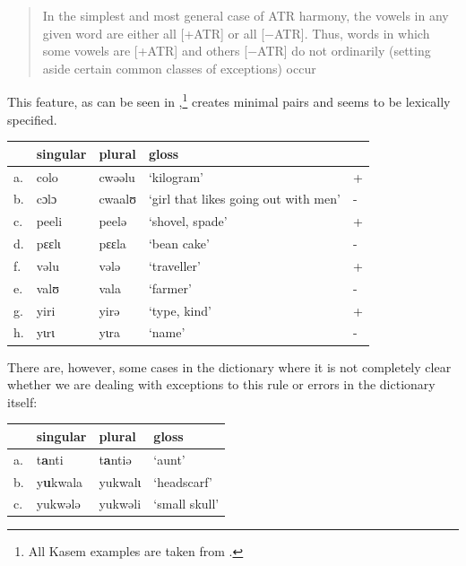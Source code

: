 \begin{quotation}
In the simplest and most general case of ATR harmony, the vowels in any given word are either all [+ATR] or all [−ATR]. Thus, words in which some vowels are [+ATR] and others [−ATR] do not ordinarily (setting aside certain common classes of exceptions) occur \autocite[496]{Casali.2008}
\end{quotation}

This feature, as can be seen in ,\footnote{All Kasem examples are taken from \textcite{Niggli.2016}.} creates minimal pairs and seems to be lexically specified.

\begin{exe}
    \ex \label{atr}
    \begin{tabular}[t]{lllll}
      & singular & plural & gloss                                &   \\
      \midrule
      a. & colo     & cwəəlu & `kilogram'                           & + \\
      b. & cɔlɔ     & cwaalʊ & `girl that likes going out with men' & - \\
      c. & peeli    & peelə  & `shovel, spade'                      & + \\
      d. & pɛɛlɩ    & pɛɛla  & `bean cake'                          & - \\
      f. & vəlu     & vələ   & `traveller'                          & + \\
      e. & valʊ     & vala   & `farmer'                             & - \\
      g. & yiri     & yirə   & `type, kind'                         & + \\
      h. & yɩrɩ     & yɩra   & `name'                               & - \\
    \end{tabular}
\end{exe}

There are, however, some cases in the dictionary where it is not completely clear whether we are dealing with exceptions to this rule or errors in the dictionary itself:

\begin{exe}
    \ex \label{atr-errors}
    \begin{tabular}[t]{llll}
      & singular         & plural          & gloss         \\
      \midrule
      a. & t\textbf{a}nti   & t\textbf{a}ntiə & `aunt'        \\
      b. & y\textbf{u}kwala & yukwalɩ         & `headscarf'   \\
      c. & yukwələ          & yukwəli         & `small skull' \\
    \end{tabular}
\end{exe}

